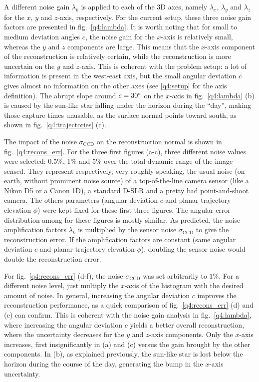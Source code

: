 \documentclass{report}
\begin{document}
A different noise gain $\lambda_k$ is applied to each of the 3D axes, namely $\lambda_x$, $\lambda_y$ and $\lambda_z$ for the $x$, $y$ and $z$-axis, respectively. For the current setup, these three noise gain factors are presented in fig.~\ref{q4:lambda}. It is worth noting that for small to medium deviation angles $c$, the noise gain for the $x$-axis is relatively small, whereas the $y$ and $z$ components are large. This means that the $x$-axis component of the reconstruction is relatively certain, while the reconstruction is more uncertain on the $y$ and $z$-axis. This is coherent with the problem setup: a lot of information is present in the west-east axis, but the small angular deviation $c$ gives almost no information on the other axes (see \ref{q4:setup} for the axis definition). The abrupt slope around $c = 30\degree$ on the $x$-axis in fig.~\ref{q4:lambda} (b) is caused by the sun-like star falling under the horizon during the ``day'', making those capture times unusable, as the surface normal points toward south, as shown in fig.~\ref{q4:trajectories} (c).

The impact of the noise $\sigma_\text{CCD}$ on the reconstruction normal is shown in fig.~\ref{q4:recons_err}. For the three first figures (a-c), three different noise values were selected: 0.5\%, 1\% and 5\% over the total dynamic range of the image sensed. They represent respectively, very roughly speaking, the usual noise (on earth, without prominent noise source) of a top-of-the-line camera sensor (like a Nikon D5 or a Canon 1D), a standard D-SLR and a pretty bad point-and-shoot camera. The others parameters (angular deviation $c$ and planar trajectory elevation $\phi$) were kept fixed for these first three figures. The angular error distribution among for these figures is mostly similar. As predicted, the noise amplification factors $\lambda_k$ is multiplied by the sensor noise $\sigma_\text{CCD}$ to give the reconstruction error. If the amplification factors are constant (same angular deviation $c$ and planar trajectory elevation $\phi$), doubling the sensor noise would double the reconstruction error.

For fig.~\ref{q4:recons_err} (d-f), the noise $\sigma_\text{CCD}$ was set arbitrarily to $1\%$. For a different noise level, just multiply the $x$-axis of the histogram with the desired amount of noise. In general, increasing the angular deviation $c$ improves the reconstruction performance, as a quick comparison of fig.~\ref{q4:recons_err} (d) and (e) can confirm. This is coherent with the noise gain analysis in fig.~\ref{q4:lambda}, where increasing the angular deviation $c$ yields a better overall reconstruction, where the uncertainty decreases for the $y$ and $z$-axis components. Only the $x$-axis increases, first insignificantly in (a) and (c) versus the gain brought by the other components. In (b), as explained previously, the sun-like star is lost below the horizon during the course of the day, generating the bump in the $x$-axis uncertainty.
\end{document}
